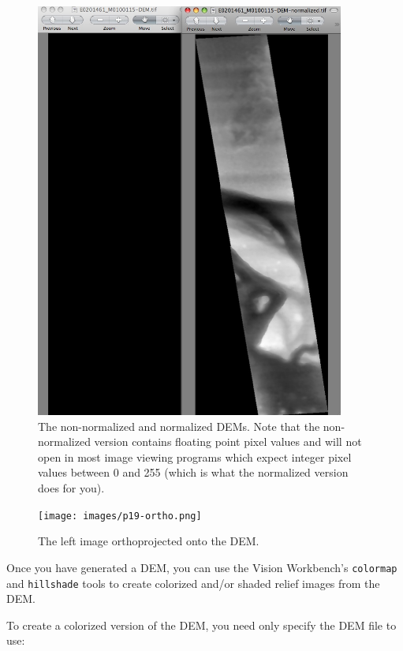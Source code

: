 \begin{figure}
\begin{center}
\includegraphics[width=4in]{images/p19-dems.png}
\caption[P19 dem images]{
    \label{p19-dems}
	The non-normalized and normalized DEMs. Note that the
	non-normalized version contains floating point pixel values
	and will not open in most image viewing programs which
	expect integer pixel values between 0 and 255 (which is
	what the normalized version does for you).
    }
\end{center}
\end{figure}

\begin{figure}
\begin{center}
\texttt{[image: images/p19-ortho.png]}
\caption[P19 orthophoto]{
    \label{p19-ortho}
	The left image orthoprojected onto the DEM.
    }
\end{center}
\end{figure}

Once you have generated a DEM, you can use the Vision Workbench's
\texttt{colormap} and \texttt{hillshade} tools to create colorized
and/or shaded relief images from the DEM.

To create a colorized version of the DEM, you need only specify the
DEM file to use:


